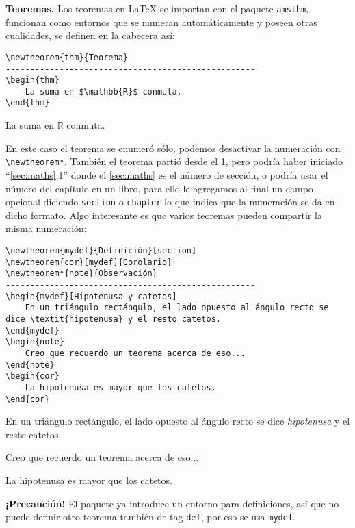 \documentclass[intro-breve-latex.tex]{subfiles}
\begin{document}
\textbf{Teoremas.} Los teoremas en \LaTeX{} se importan con el paquete \texttt{amsthm}, funcionan como entornos que se numeran automáticamente y poseen otras cualidades, se definen en la cabecera así:
\begin{lstlisting}
\newtheorem{thm}{Teorema}
---------------------------------------------------
\begin{thm}
	La suma en $\mathbb{R}$ conmuta.
\end{thm}
\end{lstlisting}
\begin{thm}
	La suma en $\mathbb{R}$ conmuta.
\end{thm}
En este caso el teorema se enumeró sólo, podemos desactivar la numeración con \lstinline|\newtheorem*|. También el teorema partió desde el 1, pero podría haber iniciado ``\ref{sec:maths}.1'' donde el \ref{sec:maths} es el número de sección, o podría usar el número del capítulo en un libro, para ello le agregamos al final un campo opcional diciendo \texttt{section} o \texttt{chapter} lo que indica que la numeración se da en dicho formato. Algo interesante es que varios teoremas pueden compartir la misma numeración:
\begin{lstlisting}
\newtheorem{mydef}{Definición}[section]
\newtheorem{cor}[mydef]{Corolario}
\newtheorem*{note}{Observación}
---------------------------------------------------
\begin{mydef}[Hipotenusa y catetos]
	En un triángulo rectángulo, el lado opuesto al ángulo recto se dice \textit{hipotenusa} y el resto catetos.
\end{mydef}
\begin{note}
	Creo que recuerdo un teorema acerca de eso...
\end{note}
\begin{cor}
	La hipotenusa es mayor que los catetos.
\end{cor}
\end{lstlisting}
\begin{mydef}
	En un triángulo rectángulo, el lado opuesto al ángulo recto se dice \textit{hipotenusa} y el resto catetos.
\end{mydef}
\begin{note}
	Creo que recuerdo un teorema acerca de eso...
\end{note}
\begin{cor}
	La hipotenusa es mayor que los catetos.
\end{cor}
\textbf{¡Precaución!} El paquete ya introduce un entorno para definiciones, así que no puede definir otro teorema también de tag \texttt{def}, por eso se usa \texttt{mydef}.
\end{document}

